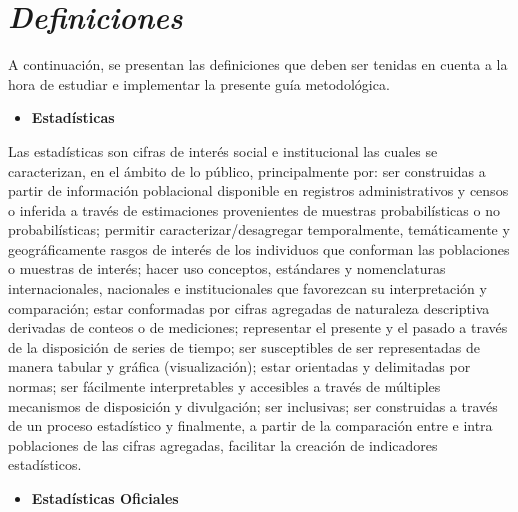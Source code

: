 \documentclass[
]{book}
\providecommand{\tightlist}{%
  \setlength{\itemsep}{0pt}\setlength{\parskip}{0pt}}
\begin{document}
\hypertarget{definiciones}{%
\chapter{\texorpdfstring{\textbf{\emph{Definiciones}}}{Definiciones}}\label{definiciones}}

A continuación, se presentan las definiciones que deben ser tenidas en cuenta a la hora de estudiar e implementar la presente guía metodológica.

\begin{itemize}
\tightlist
\item
  \textbf{Estadísticas}
\end{itemize}

Las estadísticas son cifras de interés social e institucional las cuales se caracterizan, en el ámbito de lo público, principalmente por: ser construidas a partir de información poblacional disponible en registros administrativos y censos o inferida a través de estimaciones provenientes de muestras probabilísticas o no probabilísticas; permitir caracterizar/desagregar temporalmente, temáticamente y geográficamente rasgos de interés de los individuos que conforman las poblaciones o muestras de interés; hacer uso conceptos, estándares y nomenclaturas internacionales, nacionales e institucionales que favorezcan su interpretación y comparación; estar conformadas por cifras agregadas de naturaleza descriptiva derivadas de conteos o de mediciones; representar el presente y el pasado a través de la disposición de series de tiempo; ser susceptibles de ser representadas de manera tabular y gráfica (visualización); estar orientadas y delimitadas por normas; ser fácilmente interpretables y accesibles a través de múltiples mecanismos de disposición y divulgación; ser inclusivas; ser construidas a través de un proceso estadístico y finalmente, a partir de la comparación entre e intra poblaciones de las cifras agregadas, facilitar la creación de indicadores estadísticos.

\begin{itemize}
\tightlist
\item
  \textbf{Estadísticas Oficiales}
\end{itemize}
\end{document}

